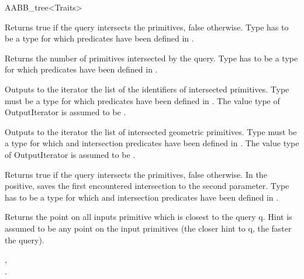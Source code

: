 \begin{ccRefClass}{AABB_tree<Traits>}
\ccOperations

{ Returns true if the query intersects the primitives, false otherwise. Type  has to be a type for which  predicates have been defined in .}
	
{Returns the number of primitives intersected by the query. Type  has to be a type for which  predicates have been defined in .}
	
{Outputs to the iterator the list of the identifiers of intersected primitives. Type  must be a type for which  predicates have been defined in .
The value type of OutputIterator is assumed to be .}
	
{Outputs to the iterator the list of intersected geometric primitives. Type  must be a type for which  and intersection predicates have been defined in . The value type of OutputIterator is assumed to be .}


{Returns true if the query intersects the primitives, false otherwise. In the positive, saves the first encountered intersection to the second parameter. Type  has to be a type for which  and intersection predicates have been defined in .}
	
{Returns the point on all inputs primitive which is closest to the query q. Hint is assumed to be any point on the input primitives (the closer hint to q, the faster the query).}








\ccSeeAlso

, \\
.


\end{ccRefClass}
